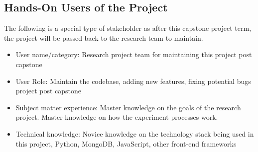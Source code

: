 \documentclass[12pt]{article}
\begin{document}
\subsection{Hands-On Users of the Project}
\label{sec:2.4}
The following is a special type of stakeholder as after this capstone project
term, the project will be passed back to the research team to maintain. 
\begin{itemize}
  \item User name/category: Research project team for maintaining this project post capstone 
  \item User Role: Maintain the codebase, adding new features, fixing potential bugs
  project post capstone
  \item Subject matter experience: Master knowledge on the goals of the research
  project. Master knowledge on how the experiment processes work. 
  \item Technical knowledge: Novice knowledge on the technology stack being
  used in this project, Python, MongoDB, JavaScript, other front-end frameworks 
\end{itemize}
\end{document}
